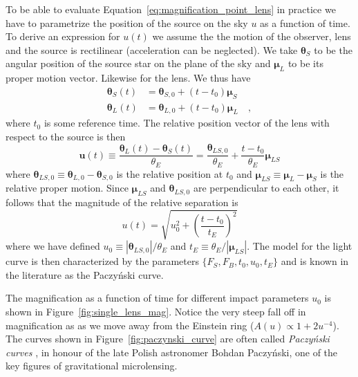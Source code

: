 \documentclass[11pt]{report}
\begin{document}
To be able to evaluate Equation~\ref{eq:magnification_point_lens} in practice
we have to parametrize the position of the source on the sky $u$ as a function
of time. To derive an expression for $u(t)$ we assume the the motion of the
observer, lens and the source is rectilinear (acceleration can be neglected).
We take $\boldsymbol{\theta}_S$ to be the angular position of the source star
on the plane of the sky and $\boldsymbol{\mu}_L$ to be its proper motion
vector. Likewise for the lens. We thus have
\begin{align}
    \boldsymbol{\theta}_S(t) & =\boldsymbol{\theta}_{S, 0}+
    \left(t-t_{0}\right) \boldsymbol{\mu}_S
    \label{eq:source_position}                              \\
    \boldsymbol{\theta}_L(t) & =\boldsymbol{\theta}_{L, 0}
    +\left(t-t_{0}\right) \boldsymbol{\mu}_L\quad,
    \label{eq:lens_position}
\end{align}
where $t_0$ is some reference time.
The relative position vector of the lens with respect to the source is then
\begin{equation}
    \boldsymbol{u}(t) \equiv \frac{\boldsymbol{\theta}_L(t)
        -\boldsymbol{\theta}_S(t)}{\theta_E}=
    \frac{\boldsymbol{\theta}_{LS, 0}}{\theta_E}
    +\frac{t-t_{0}}{\theta_E} \boldsymbol{\mu}_{LS}
    \label{eq:relative_trajectory_no_parallax}
\end{equation}
where
$\boldsymbol{\theta}_{L S, 0}\equiv\boldsymbol{\theta}_{L,0}-\boldsymbol{\theta}_{S, 0}$
is the relative position at $t_0$ and
$\boldsymbol{\mu}_{LS}\equiv \boldsymbol{\mu}_{L}- \boldsymbol{\mu}_{S}$ is the
relative proper motion.
Since $\boldsymbol{\mu}_{LS}$ and $\boldsymbol{\theta}_{L S, 0}$ are
perpendicular to each other, it follows that the magnitude of the relative
separation is
\begin{equation}
    u(t)=\sqrt{u_0^2+ \left(\frac{t-t_0}{t_E}\right)^2}
\end{equation}
where we have defined $u_0\equiv |\boldsymbol{\theta}_{L S, 0}|/\theta_E$
and $t_E\equiv \theta_E/|\boldsymbol{\mu}_{LS}|$.
The model for the light curve is then characterized by
the parameters $\{F_S,F_B, t_0, u_0, t_E\}$ and is known in the
literature as the Paczy\'nski curve.

The magnification as a function of time for different impact parameters $u_0$
is shown in Figure~\ref{fig:single_lens_mag}. Notice the very steep fall off in
magnification as as we move away from the Einstein ring ($A(u)\propto
    1+2u^{-4}$). The curves shown in Figure~\ref{fig:paczynski_curve} are often
called \emph{Paczyński curves} \citep{1986ApJ...304....1P,1986ApJ...301..503P},
in honour of the late Polish astronomer Bohdan Paczyński, one of the key
figures of gravitational microlensing.
\end{document}

